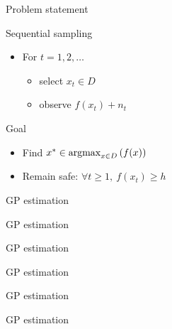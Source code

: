 \documentclass[xetex,10pt,mathserif,handout]{beamer}
\newlength\figureheight
\newlength\figurewidth
\begin{document}
\begin{frame}{Problem statement}
	
Sequential sampling
\vspace{0.5em}
\begin{itemize}
\item For $t = 1, 2, \ldots$
  \vspace{0.5em}
  \begin{itemize}
    \item select $x_t \in D$
    \vspace{0.5em}
    \item observe $f(x_t) + n_t$
  \end{itemize}
\end{itemize}
\vspace{3em}
Goal
\vspace{0.5em}
\begin{itemize}
\item Find $x^* \in \argmax_{x\in D}\left(f(x)\right)$
\vspace{0.5em}
\item Remain safe: $\forall t \geq 1,\ f(x_t) \geq h$
\end{itemize}
\end{frame}

\begin{frame}{GP estimation}
\centering
\setlength\figurewidth{5in}
\setlength\figureheight{3.5in}

\end{frame}

\begin{frame}{GP estimation}
\centering
\setlength\figurewidth{5in}
\setlength\figureheight{3.5in}

\end{frame}

\begin{frame}{GP estimation}
\centering
\setlength\figurewidth{5in}
\setlength\figureheight{3.5in}

\end{frame}

\begin{frame}{GP estimation}
\centering
\setlength\figurewidth{5in}
\setlength\figureheight{3.5in}

\end{frame}

\begin{frame}{GP estimation}
\centering
\setlength\figurewidth{5in}
\setlength\figureheight{3.5in}

\end{frame}

\begin{frame}{GP estimation}
\centering
\setlength\figurewidth{5in}
\setlength\figureheight{3.5in}

\end{frame}
\end{document}
